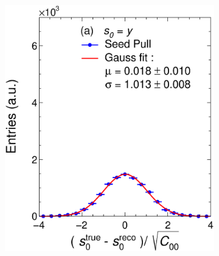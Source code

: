 \begin{figure}[t]
     \centering
     \begin{subfigure}{0.32\textwidth}
         \centering
         \includegraphics[width=\textwidth]{figures/ch4-KF_NDGArLite/MC/ILRM+KF/UnitSeed_p0.eps}
         \caption{}
         \label{fig:resp0Seed_GArLite_ILRM+KF}
     \end{subfigure}
     \begin{subfigure}{0.32\textwidth}
         \centering

\end{subfigure}
\end{figure}

